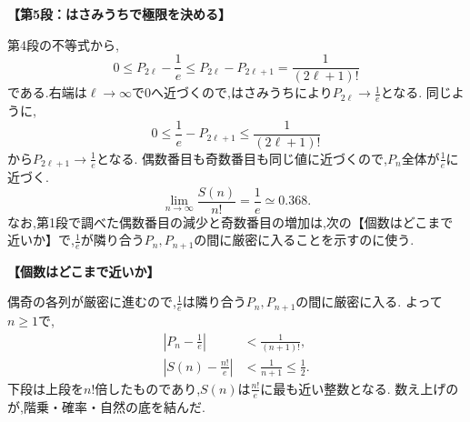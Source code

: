 \begin{enumerate}[label=\textbf{問\arabic*.},leftmargin=3.8em,format=\bookitemlink{practice-entrance}{solution}{problem}]
    \par\smallskip\noindent\textbf{【第5段：はさみうちで極限を決める】}\par\nopagebreak[4]
    第4段の不等式から,
    \[
      0\le P_{2\ell}-\frac1e\le P_{2\ell}-P_{2\ell+1}=\frac1{(2\ell+1)!}
    \]
    である.右端は$\ell\to\infty$で0へ近づくので,はさみうちにより$P_{2\ell}\to\frac1e$となる.
    同じように,
    \[
      0\le\frac1e-P_{2\ell+1}\le\frac1{(2\ell+1)!}
    \]
    から$P_{2\ell+1}\to\frac1e$となる.
    偶数番目も奇数番目も同じ値に近づくので,$P_n$全体が$\frac1e$に近づく.
    \[
      \boxed{\lim_{n\to\infty}\frac{S(n)}{n!}=\frac1e\simeq0.368}.
    \]
    なお,第1段で調べた偶数番目の減少と奇数番目の増加は,次の【個数はどこまで近いか】で,$\frac1e$が隣り合う$P_n,P_{n+1}$の間に厳密に入ることを示すのに使う.
    \par\smallskip\noindent\textbf{【個数はどこまで近いか】}\par\nopagebreak[4]
    偶奇の各列が厳密に進むので,$\frac{1}{e}$は隣り合う$P_n,P_{n+1}$の間に厳密に入る.
    よって$n\ge1$で,
    \[
      \begin{aligned}
        \left|P_n-\frac1e\right|&<\frac1{(n+1)!},\\
        \left|S(n)-\frac{n!}e\right|&<\frac1{n+1}\le\frac12.
      \end{aligned}
    \]
    下段は上段を$n!$倍したものであり,$S(n)$は$\frac{n!}{e}$に最も近い整数となる.
    数え上げのが,階乗・確率・自然の底を結んだ.
\end{enumerate}
